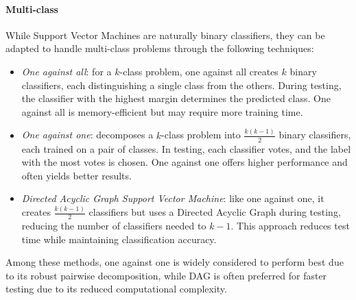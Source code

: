 \paragraph*{Multi-class}
While Support Vector Machines are naturally binary classifiers, they can be adapted to handle multi-class problems through the following techniques:
\begin{itemize}
    \item \textit{One against all}: for a $k$-class problem, one against all creates $k$ binary classifiers, each distinguishing a single class from the others.
        During testing, the classifier with the highest margin determines the predicted class.
        One against all is memory-efficient but may require more training time.
    \item \textit{One against one}: decomposes a $k$-class problem into  $\frac{k(k-1)}{2}$ binary classifiers, each trained on a pair of classes. 
        In testing, each classifier votes, and the label with the most votes is chosen. 
        One against one offers higher performance and often yields better results.
    \item \textit{Directed Acyclic Graph Support Vector Machine}: like one against one, it creates $\frac{k(k-1)}{2}$ classifiers but uses a Directed Acyclic Graph during testing, reducing the number of classifiers needed to $k-1$. 
        This approach reduces test time while maintaining classification accuracy.
\end{itemize}
Among these methods, one against one is widely considered to perform best due to its robust pairwise decomposition, while DAG is often preferred for faster testing due to its reduced computational complexity.